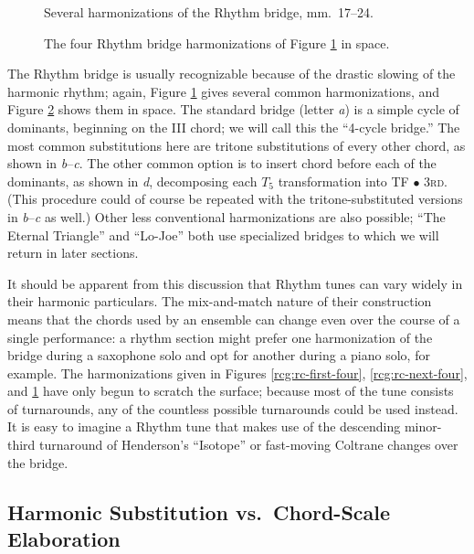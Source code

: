 \begin{figure}[tbp]
  \caption{Several harmonizations of the Rhythm bridge, mm.~17--24.}
  \label{rcg:rc-bridge}
\end{figure}

\begin{figure}[tbp]
  \caption{The four Rhythm bridge harmonizations of Figure \ref{rcg:rc-bridge}
    in \tf space.}
  \label{rcg:rc-bridge-space}
\end{figure}

The Rhythm bridge is usually recognizable because of the drastic slowing of
the harmonic rhythm; again, Figure \ref{rcg:rc-bridge} gives several common
harmonizations, and Figure \ref{rcg:rc-bridge-space} shows them in \tf space.
The standard bridge (letter \emph{a}) is a simple cycle of dominants,
beginning on the III chord; we will call this the ``4-cycle bridge.'' The most
common substitutions here are tritone substitutions of every other chord, as
shown in \emph{b}--\emph{c}. The other common option is to insert \ii chord
before each of the dominants, as shown in \emph{d}, decomposing each $T_5$
transformation into TF $\bullet$ \textsc{3rd}. (This procedure could of course
be repeated with the tritone-substituted versions in \emph{b}--\emph{c} as
well.) Other less conventional harmonizations are also possible; ``The Eternal
Triangle'' and ``Lo-Joe'' both use specialized bridges to which we will return
in later sections.

It should be apparent from this discussion that Rhythm tunes can vary widely
in their harmonic particulars. The mix-and-match nature of their construction
means that the chords used by an ensemble can change even over the course of a
single performance: a rhythm section might prefer one harmonization of the
bridge during a saxophone solo and opt for another during a piano solo, for
example. The harmonizations given in Figures \ref{rcg:rc-first-four},
\ref{rcg:rc-next-four}, and \ref{rcg:rc-bridge} have only begun to scratch the
surface; because most of the tune consists of turnarounds, any of the
countless possible turnarounds could be used instead. It is easy to
imagine a Rhythm tune that makes use of the descending minor-third turnaround
of Henderson's ``Isotope'' or fast-moving Coltrane changes over the bridge.

\subsection{Harmonic Substitution vs.\ Chord-Scale Elaboration}

